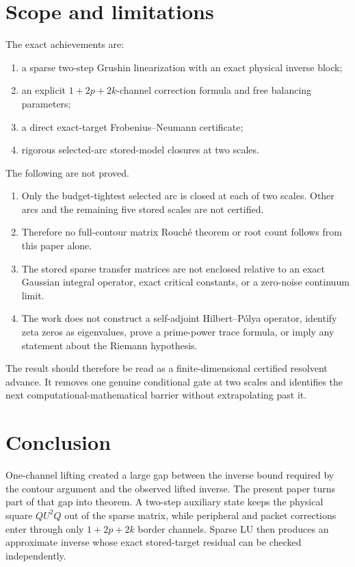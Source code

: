 \documentclass[11pt]{article}
\theoremstyle{definition}
\theoremstyle{remark}
\begin{document}
\section{Scope and limitations}
\label{sec:limitations}

The exact achievements are:
\begin{enumerate}
 \item a sparse two-step Grushin linearization with an exact physical inverse
       block;
 \item an explicit $1+2p+2k$-channel correction formula and free balancing
       parameters;
 \item a direct exact-target Frobenius--Neumann certificate;
 \item rigorous selected-arc stored-model closures at two scales.
\end{enumerate}

The following are not proved.
\begin{enumerate}
 \item Only the budget-tightest selected arc is closed at each of two scales.
       Other arcs and the remaining five stored scales are not certified.
 \item Therefore no full-contour matrix Rouch\'e theorem or root count follows
       from this paper alone.
 \item The stored sparse transfer matrices are not enclosed relative to an
       exact Gaussian integral operator, exact critical constants, or a
       zero-noise continuum limit.
 \item The work does not construct a self-adjoint Hilbert--P\'olya operator,
       identify zeta zeros as eigenvalues, prove a prime-power trace formula,
       or imply any statement about the Riemann hypothesis.
\end{enumerate}

The result should therefore be read as a finite-dimensional certified
resolvent advance.  It removes one genuine conditional gate at two scales
and identifies the next computational-mathematical barrier without
extrapolating past it.


\section{Conclusion}
\label{sec:conclusion}

One-channel lifting created a large gap between the inverse bound required by
the contour argument and the observed lifted inverse.  The present paper
turns part of that gap into theorem.  A two-step auxiliary state keeps the
physical square $QU^2Q$ out of the sparse matrix, while peripheral and packet
corrections enter through only $1+2p+2k$ border channels.  Sparse LU then
produces an approximate inverse whose exact stored-target residual can be
checked independently.
\end{document}

